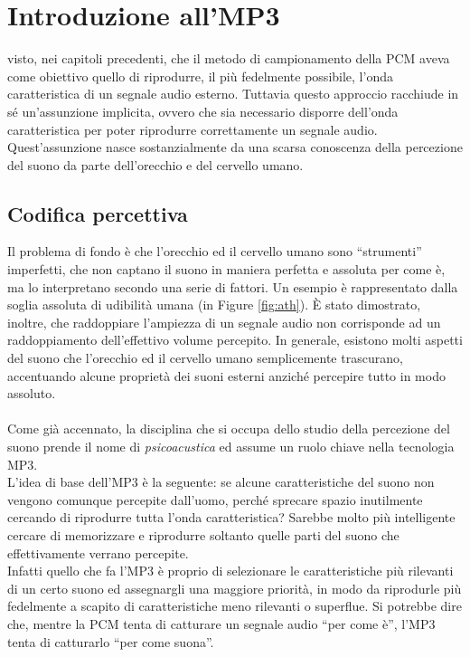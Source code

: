 \chapter{Introduzione all'MP3} \label{chap:introduzione_mp3}
	
	 visto, nei capitoli precedenti, che il metodo di campionamento della PCM aveva come obiettivo quello di riprodurre, il più fedelmente possibile, l'onda caratteristica di un segnale audio esterno. Tuttavia questo approccio racchiude in sé un'assunzione implicita, ovvero che sia necessario disporre dell'onda caratteristica per poter riprodurre correttamente un segnale audio. Quest'assunzione nasce sostanzialmente da una scarsa conoscenza della percezione del suono da parte dell'orecchio e del cervello umano.
	
	\section{Codifica percettiva} \label{sec:codifica_percettiva}
		Il problema di fondo è che l'orecchio ed il cervello umano sono  ``strumenti'' imperfetti, che non captano il suono in maniera perfetta e assoluta per come è, ma lo interpretano secondo una serie di fattori. Un esempio è rappresentato dalla soglia assoluta di udibilità umana (in Figure \ref{fig:ath}). È stato dimostrato, inoltre, che raddoppiare l'ampiezza di un segnale audio non corrisponde ad un raddoppiamento dell'effettivo volume percepito. In generale, esistono molti aspetti del suono che l'orecchio ed il cervello umano semplicemente trascurano, accentuando alcune proprietà dei suoni esterni anziché percepire tutto in modo assoluto.\\
		\\
		Come già accennato, la disciplina che si occupa dello studio della percezione del suono prende il nome di \textit{psicoacustica} ed assume un ruolo chiave nella tecnologia MP3.\\
		L'idea di base dell'MP3 è la seguente: se alcune caratteristiche del suono non vengono comunque percepite dall'uomo, perché sprecare spazio inutilmente cercando di riprodurre tutta l'onda caratteristica? Sarebbe molto più intelligente cercare di memorizzare e riprodurre soltanto quelle parti del suono che effettivamente verrano percepite.\\
		Infatti quello che fa l'MP3 è proprio di selezionare le caratteristiche più rilevanti di un certo suono ed assegnargli una maggiore priorità, in modo da riprodurle più fedelmente a scapito di caratteristiche meno rilevanti o superflue. Si potrebbe dire che, mentre la PCM tenta di catturare un segnale audio ``per come è'', l'MP3 tenta di catturarlo ``per come suona''.\\
